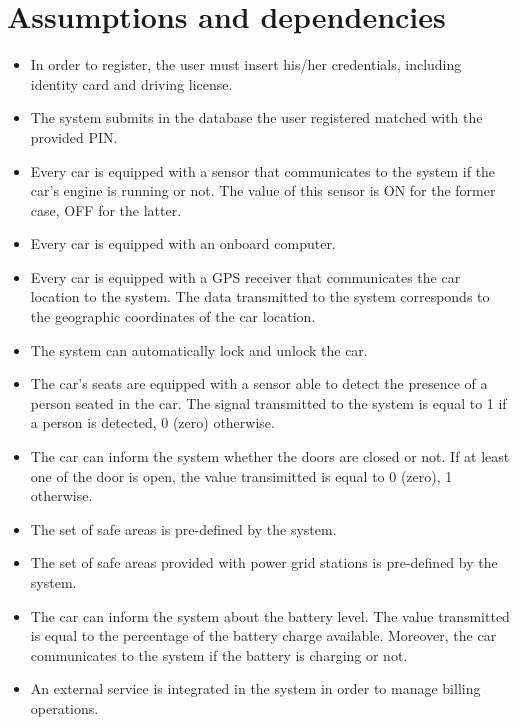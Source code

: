 \section{Assumptions and dependencies}

\begin{itemize}
	\item In order to register, the user must insert his/her credentials, including identity card and driving license.
	\item The system submits in the database the user registered matched with the provided PIN.
	\item Every car is equipped with a sensor that communicates to the system if the car's engine is running or not. The value of this sensor is ON for the former case, OFF for the latter.
	\item Every car is equipped with an onboard computer.
	\item Every car is equipped with a GPS receiver that communicates the car location to the system. The data transmitted to the system corresponds to the geographic coordinates of the car location.
	\item The system can automatically lock and unlock the car.
	\item The car's seats are equipped with a sensor able to detect the presence of a person seated in the car. The signal transmitted to the system is equal to 1 if a person is detected, 0 (zero) otherwise.
	\item The car can inform the system whether the doors are closed or not. If at least one of the door is open, the value transimitted is equal to 0 (zero), 1 otherwise.
	\item The set of safe areas is pre-defined by the system.
	\item The set of safe areas provided with power grid stations is pre-defined by the system.
	\item The car can inform the system about the battery level. The value transmitted is equal to the percentage of the battery charge available. Moreover, the car communicates to the system if the battery is charging or not.
	\item An external service is integrated in the system in order to manage billing operations.
\end{itemize}